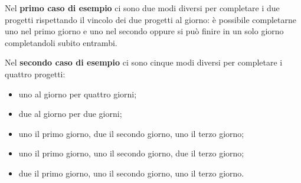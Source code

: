 \Explanation

Nel \textbf{primo caso di esempio} ci sono due modi diversi per completare i due progetti rispettando il vincolo dei due progetti al giorno: è possibile completarne uno nel primo giorno e uno nel secondo oppure si può finire in un solo giorno completandoli subito entrambi.

Nel \textbf{secondo caso di esempio} ci sono cinque modi diversi per completare i quattro progetti:
\begin{itemize}[nolistsep, itemsep=2mm]
    \item uno al giorno per quattro giorni;
    \item due al giorno per due giorni;
    \item uno il primo giorno, due il secondo giorno, uno il terzo giorno;
    \item uno il primo giorno, uno il secondo giorno, due il terzo giorno;
    \item due il primo giorno, uno il secondo giorno, uno il terzo giorno.
\end{itemize}
